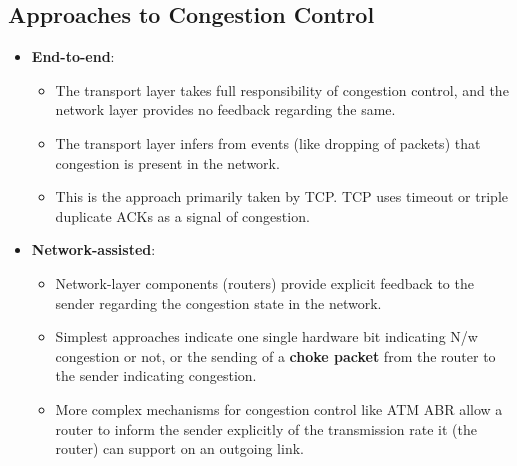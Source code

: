 \documentclass{article}
\theoremstyle{plain}
\theoremstyle{definition}
\begin{document}
\subsection{Approaches to Congestion Control}
\begin{itemize}
    \item \textbf{End-to-end}: 
    \begin{itemize}
        \item The transport layer takes full responsibility of congestion control, and the network layer provides no feedback regarding the same.
        
        \item The transport layer infers from events (like dropping of packets) that congestion is present in the network. 
        
        \item This is the approach primarily taken by TCP. TCP uses timeout or triple duplicate ACKs as a signal of congestion. 
    \end{itemize}
    
    \item \textbf{Network-assisted}:
    \begin{itemize}
        \item Network-layer components (routers) provide explicit feedback to the sender regarding the congestion state in the network.
        
        \item Simplest approaches indicate one single hardware bit indicating N/w congestion or not, or the sending of a \textbf{choke packet} from the router to the sender indicating congestion. 
        
        \item More complex mechanisms for congestion control like ATM ABR allow a router to inform the sender explicitly of the transmission rate it (the router) can support on an outgoing link.
    \end{itemize}
\end{itemize}
\end{document}
